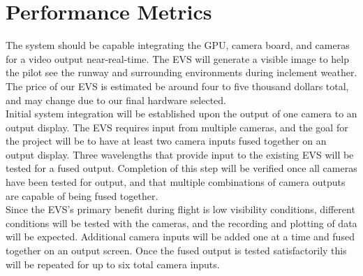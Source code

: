 \documentclass[letterpaper,10pt,serif,draftclsnofoot,onecolumn,compsoc,titlepage]{IEEEtran}
\begin{document}
\section{Performance Metrics}

The system should be capable integrating the GPU, camera board, and cameras for a 
video output near-real-time. The EVS will generate a visible image to help the pilot 
see the runway and surrounding environments during inclement weather. The price of 
our EVS is estimated be around four to five thousand dollars total, and may change 
due to our final hardware selected. \\

Initial system integration will be established upon the output of one camera to an 
output display. The EVS requires input from multiple cameras, and the goal for the 
project will be to have at least two camera inputs fused together on an output 
display. Three wavelengths that provide input to the existing EVS will be tested for 
a fused output. Completion of this step will be verified once all cameras have been 
tested for output, and that multiple combinations of camera outputs are capable of 
being fused together. \\

Since the EVS’s primary benefit during flight is low visibility conditions, different 
conditions will be tested with the cameras, and the recording and plotting of data 
will be expected. Additional camera inputs will be added one at a time and fused 
together on an output screen. Once the fused output is tested satisfactorily this 
will be repeated for up to six total camera inputs. \\
\end{document}
